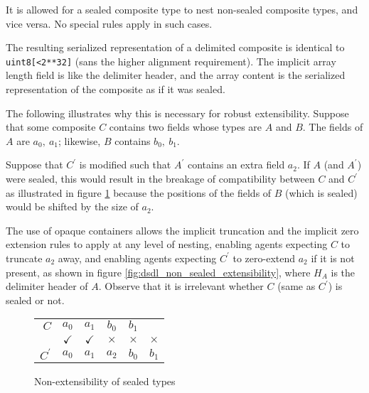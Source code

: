 It is allowed for a sealed composite type to nest non-sealed composite types, and vice versa.
No special rules apply in such cases.

\begin{remark}
    The resulting serialized representation of a delimited composite is identical to \verb|uint8[<2**32]|
    (sans the higher alignment requirement).
    The implicit array length field is like the delimiter header,
    and the array content is the serialized representation of the composite as if it was sealed.

    The following illustrates why this is necessary for robust extensibility.
    Suppose that some composite $C$ contains two fields whose types are $A$ and $B$.
    The fields of $A$ are $a_0,\ a_1$;
    likewise, $B$ contains $b_0,\ b_1$.

    Suppose that $C^\prime$ is modified such that $A^\prime$ contains an extra field $a_2$.
    If $A$ (and $A^\prime$) were sealed, this would result in the breakage of compatibility between $C$ and $C^\prime$
    as illustrated in figure \ref{fig:dsdl_sealed_non_extensibility} because the positions of the fields of $B$
    (which is sealed) would be shifted by the size of $a_2$.

    The use of opaque containers allows the implicit truncation and the implicit zero extension rules to apply
    at any level of nesting, enabling agents expecting $C$ to truncate $a_2$ away,
    and enabling agents expecting $C^\prime$ to zero-extend $a_2$
    if it is not present, as shown in figure \ref{fig:dsdl_non_sealed_extensibility},
    where $H_A$ is the delimiter header of $A$.
    Observe that it is irrelevant whether $C$ (same as $C^\prime$) is sealed or not.

    \begin{figure}[H]
        \centering
        \begin{tabular}{r c c c c c}
            \cline{2-5}
            $C$ &
            \multicolumn{1}{|c|}{$a_0$} & \multicolumn{1}{c|}{$a_1$}
            &\multicolumn{1}{c|}{$b_0$} & \multicolumn{1}{c|}{$b_1$} &
            \\\cline{2-5}
            & $\checkmark$ & $\checkmark$ & $\times$ & $\times$ & $\times$ \\
            \cline{2-6}
            $C^\prime$ &
            \multicolumn{1}{|c|}{$a_0$} & \multicolumn{1}{c|}{$a_1$} & \multicolumn{1}{c|}{$a_2$}
            &\multicolumn{1}{c|}{$b_0$} & \multicolumn{1}{c|}{$b_1$}
            \\\cline{2-6}
        \end{tabular}
        \caption{Non-extensibility of sealed types}
        \label{fig:dsdl_sealed_non_extensibility}
    \end{figure}


\end{remark}
